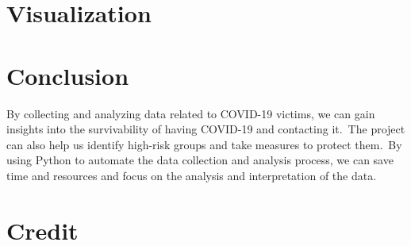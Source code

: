 \documentclass{article}
\begin{document}
\section{Visualization}


\section{Conclusion}

\indent

By collecting and analyzing data related to COVID-19 victims, we can gain insights into the survivability of having COVID-19 and contacting it.\
The project can also help us identify high-risk groups and take measures to protect them.\
By using Python to automate the data collection and analysis process, we can save time and resources and focus on the analysis and interpretation of the data.

\section{Credit}



\end{document}
